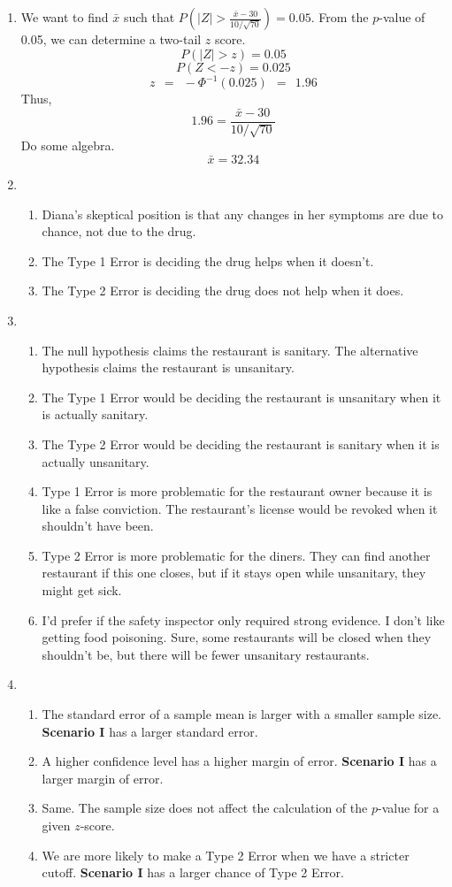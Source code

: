 \documentclass[12pt,letterpaper]{article}
\begin{document}
\begin{enumerate}
\item We want to find $\bar{x}$ such that $P\left(|Z|>\frac{\bar{x}-30}{10/\sqrt{70}}\right)=0.05$. From the $p$-value of 0.05, we can determine a two-tail $z$ score.
$$P(|Z|>z) = 0.05 $$
$$P(Z<-z) = 0.025 $$
$$z ~~=~~ -\Phi^{-1}(0.025) ~~=~~ 1.96$$
Thus,
$$1.96 = \frac{\bar{x}-30}{10/\sqrt{70}} $$
Do some algebra.
$$\bar{x} = 32.34 $$


\item \begin{enumerate}
\item Diana's skeptical position is that any changes in her symptoms are due to chance, not due to the drug.
\item The Type 1 Error is deciding the drug helps when it doesn't.
\item The Type 2 Error is deciding the drug does not help when it does.
\end{enumerate}


\item \begin{enumerate}
\item The null hypothesis claims the restaurant is sanitary. The alternative hypothesis claims the restaurant is unsanitary.
\item The Type 1 Error would be deciding the restaurant is unsanitary when it is actually sanitary.
\item The Type 2 Error would be deciding the restaurant is sanitary when it is actually unsanitary.
\item Type 1 Error is more problematic for the restaurant owner because it is like a false conviction. The restaurant's license would be revoked when it shouldn't have been.
\item Type 2 Error is more problematic for the diners. They can find another restaurant if this one closes, but if it stays open while unsanitary, they might get sick.
\item I'd prefer if the safety inspector only required strong evidence. I don't like getting food poisoning. Sure, some restaurants will be closed when they shouldn't be, but there will be fewer unsanitary restaurants.
\end{enumerate}

\item \begin{enumerate}
\item The standard error of a sample mean is larger with a smaller sample size. {\bf Scenario I} has a larger standard error.
\item A higher confidence level has a higher margin of error. {\bf Scenario I} has a larger margin of error.
\item Same. The sample size does not affect the calculation of the $p$-value for a given $z$-score.
\item We are more likely to make a Type 2 Error when we have a stricter cutoff. {\bf Scenario I} has a larger chance of Type 2 Error.
\end{enumerate} 


\end{enumerate}
\end{document}
